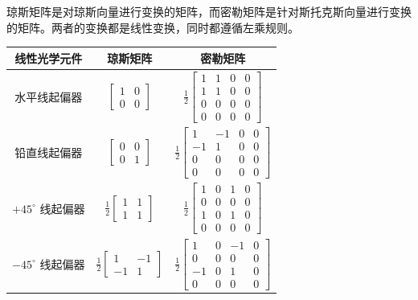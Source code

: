 \documentclass[UTF8]{ctexart}
\newcommand{\backdoc}{\normalsize}
\begin{document}
	\backdoc
	琼斯矩阵是对琼斯向量进行变换的矩阵，而密勒矩阵是针对斯托克斯向量进行变换的矩阵。两者的变换都是线性变换，同时都遵循左乘规则。
	
	\begin{center}
	\begin{tabular}{c|c|c}
		\toprule
		线性光学元件 & 琼斯矩阵 & 密勒矩阵\\
		
		\midrule
		水平线起偏器 &
		$\left[ \begin{array}{ll}{1} & {0} \\ {0} & {0}\end{array}\right]$
		&
		$\frac{1}{2} \left[ \begin{array}{llll}{1} & {1} & {0} & {0} \\ {1} & {1} & {0} & {0} \\ {0} & {0} & {0} & {0} \\ {0} & {0} & {0} & {0}\end{array}\right]$\\
		
		\midrule
		铅直线起偏器&
		$\left[ \begin{array}{ll}{0} & {0} \\ {0} & {1}\end{array}\right]$
		&
		$\frac{1}{2} \left[ \begin{array}{rrrr}{1} & {-1} & {0} & {0} \\ {-1} & {1} & {0} & {0} \\ {0} & {0} & {0} & {0} \\ {0} & {0} & {0} & {0}\end{array}\right]$\\
		
		\midrule
		$+45^{\circ}$ 线起偏器&
		$\frac{1}{2} \left[ \begin{array}{ll}{1} & {1} \\ {1} & {1}\end{array}\right]$
		&
		$\frac{1}{2} \left[ \begin{array}{llll}{1} & {0} & {1} & {0} \\ {0} & {0} & {0} & {0} \\ {1} & {0} & {1} & {0} \\ {0} & {0} & {0} & {0}\end{array}\right]$\\
		
		\midrule
		$-45^{\circ}$ 线起偏器&
		$\frac{1}{2} \left[ \begin{array}{rr}{1} & {-1} \\ {-1} & {1}\end{array}\right]$
		&
		$\frac{1}{2} \left[ \begin{array}{rrrr}{1} & {0} & {-1} & {0} \\ {0} & {0} & {0} & {0} \\ {-1} & {0} & {1} & {0} \\ {0} & {0} & {0} & {0}\end{array}\right]$\\
		

\end{tabular}
\end{center}
\end{document}

